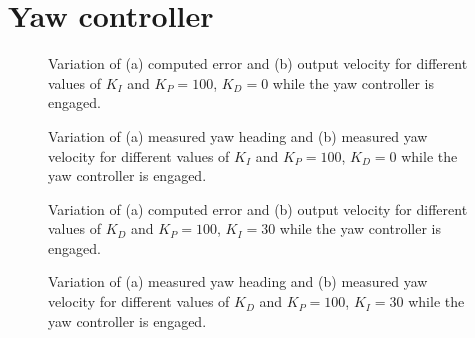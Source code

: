 \section{Yaw controller}
\label{app:yaw-pid-results}

\begin{figure}[H]
    \begin{minipage}[t]{0.5\linewidth}
        \centering
        \scalebox{0.55}{}
    \end{minipage}
    \begin{minipage}[t]{0.5\linewidth}
        \centering
        \scalebox{0.55}{}
    \end{minipage}
    \caption{Variation of (a) computed error and (b) output velocity for different values of $K_{I}$ and $K_P=100$, $K_D=0$ while the yaw controller is engaged.}
    \label{fig:tune-yaw-int-io}
\end{figure}
\begin{figure}[H]
    \begin{minipage}[t]{0.5\linewidth}
        \centering
        \scalebox{0.55}{}
    \end{minipage}
    \begin{minipage}[t]{0.5\linewidth}
        \centering
        \scalebox{0.55}{}
    \end{minipage}
    \caption{Variation of (a) measured yaw heading and (b) measured yaw velocity for different values of $K_{I}$ and $K_P=100$, $K_D=0$ while the yaw controller is engaged.}
    \label{fig:tune-yaw-int-measures}
\end{figure}

\begin{figure}[H]
    \begin{minipage}[t]{0.5\linewidth}
        \centering
        \scalebox{0.55}{}
    \end{minipage}
    \begin{minipage}[t]{0.5\linewidth}
        \centering
        \scalebox{0.55}{}
    \end{minipage}
    \caption{Variation of (a) computed error and (b) output velocity for different values of $K_{D}$ and $K_P=100$, $K_I=30$ while the yaw controller is engaged.}
    \label{fig:tune-yaw-der-io}
\end{figure}
\begin{figure}[H]
    \begin{minipage}[t]{0.5\linewidth}
        \centering
        \scalebox{0.55}{}
    \end{minipage}
    \begin{minipage}[t]{0.5\linewidth}
        \centering
        \scalebox{0.55}{}
    \end{minipage}
    \caption{Variation of (a) measured yaw heading and (b) measured yaw velocity for different values of $K_{D}$ and $K_P=100$, $K_I=30$ while the yaw controller is engaged.}
    \label{fig:tune-yaw-der-measures}
\end{figure}

